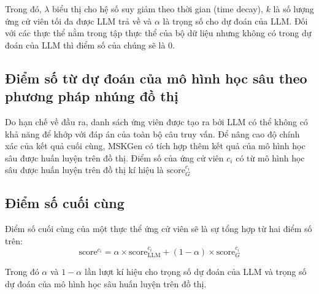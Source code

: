 Trong đó, $\lambda$ biểu thị cho hệ số suy giảm theo thời gian (time decay), $k$ là số lượng ứng cử viên tối đa được LLM trả về và $\alpha$ là trọng số cho dự đoán của LLM. Đối với các thực thể nằm trong tập thực thể của bộ dữ liệu nhưng không có trong dự đoán của LLM thì điểm số của chúng sẽ là 0.

\vspace{1em}
\subsection{Điểm số từ dự đoán của mô hình học sâu theo phương pháp nhúng đồ thị}

Do hạn chế về đầu ra, danh sách ứng viên được tạo ra bởi LLM có thể không có khả năng để khớp với đáp án của toàn bộ câu truy vấn. Để nâng cao độ chính xác của kết quả cuối cùng, MSKGen có tích hợp thêm kết quả của mô hình học sâu được huấn luyện trên đồ thị. Điểm số của ứng cử viên $c_i$ có từ mô hình học sâu được huấn luyện trên đồ thị kí hiệu là $\text{score}_G^{c_i}$

\vspace{1em}
\subsection{Điểm số cuối cùng}

Điểm số cuối cùng của một thực thể ứng cử viên sẽ là sự tổng hợp từ hai điểm số trên:
\begin{equation}
    \label{eq:final-score}
    \text{score}^{c_i} = \alpha \times \text{score}^{c_i}_{\text{LLM}} + (1 - \alpha) \times \text{score}_G^{c_i}
    \tag{x}
\end{equation}

Trong đó $\alpha$ và $1 - \alpha$ lần lượt kí hiệu cho trọng số dự đoán của LLM và trọng số dự đoán của mô hình học sâu huấn luyện trên đồ thị.

